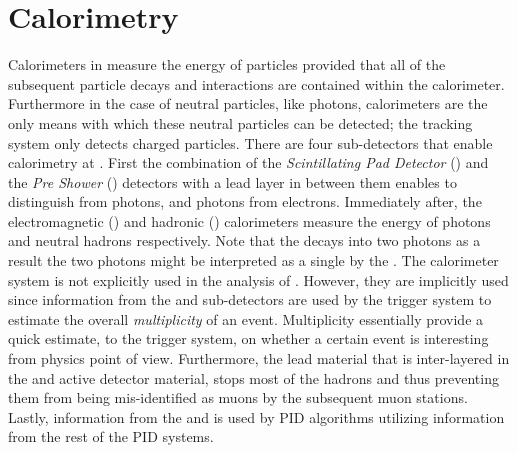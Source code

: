 

\section{Calorimetry}
\label{det_calo}
Calorimeters in \lhcb measure the energy of particles provided that all of the subsequent particle decays
and interactions are contained within the calorimeter. Furthermore in the case of neutral particles, like photons,
calorimeters are the only means with which these neutral particles can be detected; the tracking system
only detects charged particles. There are four sub-detectors that enable calorimetry at \lhcb.
First the combination of the {\it Scintillating Pad Detector} (\spd)
and the {\it Pre Shower} (\presh) detectors with a lead layer in between them enables to distinguish \piz from
photons, and photons from electrons. Immediately after, the electromagnetic (\ecal) and hadronic (\hcal)
calorimeters measure the energy of photons and neutral hadrons respectively.
Note that the \piz decays into two photons as a result the two photons might be interpreted as a single by the \ecal.
The calorimeter system is not explicitly used in the analysis of .
However, they are implicitly used since information from the \spd and \presh sub-detectors are used
by the \lzero trigger system to estimate the overall {\it multiplicity} of an event. Multiplicity essentially
provide a quick estimate, to the \lzero trigger system, on whether a certain event is interesting from physics
point of view. Furthermore, the lead material that is inter-layered in the \ecal and \hcal active detector material,
stops most of the hadrons and thus preventing them from being mis-identified as muons by the subsequent muon stations.
Lastly, information from the \ecal and \hcal is used by PID algorithms utilizing information from
the rest of the PID systems.

